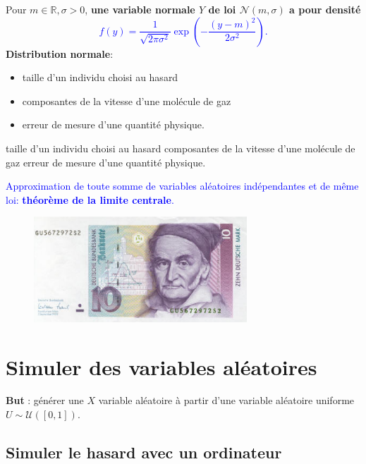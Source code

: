 Pour $m\in\mathbb{R},\sigma>0$, \textbf{une variable normale $Y$ de loi $\mathcal{N}(m,\sigma)$ a pour densité}
\textcolor{blue}{$$f(y)=\frac{1}{\sqrt{2\pi\sigma^2}}\exp(-\frac{(y-m)^2}{2\sigma^2}).$$}
\textbf{Distribution normale}:
\begin{itemize}
\item taille d’un individu choisi au hasard
\item composantes de la vitesse d’une molécule de gaz
\item erreur de mesure d’une quantité physique.

\end{itemize}
taille d’un individu choisi au hasard
composantes de la vitesse d’une molécule de gaz
erreur de mesure d’une quantité physique.

\textcolor{blue}{Approximation de toute somme de variables aléatoires indépendantes
et de même loi: \textbf{théorème de la limite centrale}.}


\begin{figure}[h]
\centering
\includegraphics[width=8cm]{content/money.PNG}

\end{figure}

\section{Simuler des variables aléatoires}

\textbf{But} :
générer une $X$ variable aléatoire à partir d’une
variable aléatoire uniforme $U \sim \mathcal{U}([0,1])$.
\subsection{Simuler le hasard avec un ordinateur}

